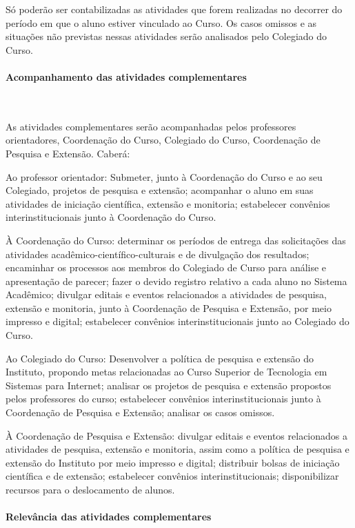 Só poderão ser contabilizadas as atividades que forem realizadas no decorrer do período em que o aluno estiver vinculado ao Curso. Os casos omissos e as situações não previstas nessas atividades serão analisados pelo Colegiado do Curso.

\paragraph{Acompanhamento das atividades complementares}\

	
	As atividades complementares serão acompanhadas pelos professores orientadores, Coordenação do Curso, Colegiado do Curso, Coordenação de Pesquisa e Extensão. Caberá:
	
	Ao professor orientador: Submeter, junto à Coordenação do Curso e ao seu Colegiado, projetos de pesquisa e extensão; acompanhar o aluno em suas atividades de iniciação científica, extensão e monitoria; estabelecer convênios interinstitucionais junto à Coordenação do Curso.
	
	À Coordenação do Curso: determinar os períodos de entrega das solicitações das atividades acadêmico-científico-culturais e de divulgação dos resultados; encaminhar os processos aos membros do Colegiado de Curso para análise e apresentação de parecer; fazer o devido registro relativo a cada aluno no Sistema Acadêmico; divulgar editais e eventos relacionados a atividades de pesquisa, extensão e monitoria, junto à Coordenação de Pesquisa e Extensão, por meio impresso e digital; estabelecer convênios interinstitucionais junto ao Colegiado do Curso.
	
	Ao Colegiado do Curso: Desenvolver a política de pesquisa e extensão do Instituto, propondo metas relacionadas ao Curso Superior de Tecnologia em Sistemas para Internet; analisar os projetos de pesquisa e extensão propostos pelos professores do curso; estabelecer convênios interinstitucionais junto à Coordenação de Pesquisa e Extensão; analisar os casos omissos.
	
	À Coordenação de Pesquisa e Extensão: divulgar editais e eventos relacionados a atividades de pesquisa, extensão e monitoria, assim como a política de pesquisa e extensão do Instituto por meio impresso e digital; distribuir bolsas de iniciação científica e de extensão; estabelecer convênios interinstitucionais; disponibilizar recursos para o deslocamento de alunos.

\paragraph{Relevância das atividades complementares}\

